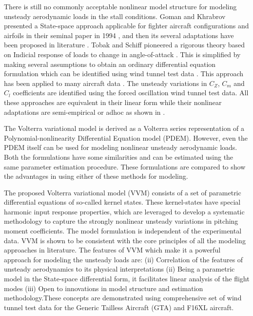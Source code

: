 \documentclass{AIAA}
\begin{document}
There is still no commonly acceptable nonlinear model structure for modeling unsteady aerodynamic loads in the stall conditions. Goman and Khrabrov presented a State-space approach applicable for fighter aircraft configurations and airfoils in their seminal paper in 1994 \cite{Goman94}, and then its several adaptations have been proposed in literature \cite{Abramov99,Abramov2,Lutze1}. Tobak and Schiff pioneered a rigorous theory based on Indicial response of loads to change in angle-of-attack \cite{Tobak1}. This is simplified by making several assumptions to obtain an ordinary differential equation formulation which can be identified using wind tunnel test data \cite{Klein,Tobak3}. This approach has been applied to many aircraft data \cite{MurphyMethods,MurphyGTM,F16XLLong}. The unsteady variations in $C_Z$, $C_m$ and $C_l$ coefficients are identified using the forced oscillation wind tunnel test data. All these approaches are equivalent in their linear form while their nonlinear adaptations are semi-empirical or adhoc as shown in \cite{GreComp,GreReview}.



The Volterra variational model is derived as a Volterra series representation of a Polynomial-nonlinearity Differential Equation model (PDEM). However, even the PDEM itself can be used for modeling nonlinear unsteady aerodynamic loads. Both the formulations have some similarities and can be estimated using the same parameter estimation procedure. These formulations are compared to show the advantages in using either of these methods for modeling.

The proposed Volterra variational model (VVM) consists of a set of parametric differential equations of so-called kernel states.  These kernel-states have special harmonic input response properties, which are leveraged to develop a systematic methodology to capture the strongly nonlinear unsteady variations in pitching moment coefficients. The model formulation is independent of the experimental data. VVM is shown to be consistent with the core principles of all the modeling approaches in literature. The features of VVM which make it a powerful approach for modeling the unsteady loads are: (ii) Correlation of the features of unsteady aerodynamics to its physical interpretations (ii) Being a parametric model in the State-space differential form, it facilitates linear analysis of the flight modes (iii) Open to innovations in model structure and estimation methodology.These concepts are demonstrated using comprehensive set of wind tunnel test data for the Generic Tailless Aircraft (GTA) and F16XL aircraft.
\end{document}
